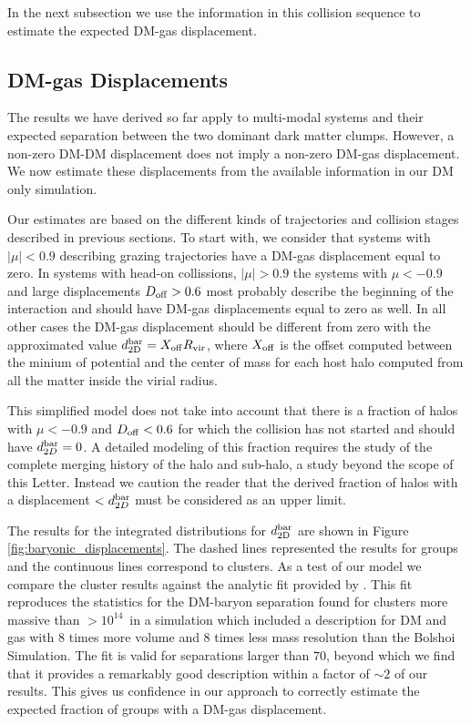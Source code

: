 \documentclass{emulateapj}
\newcommand{\hkpc}{{\ifmmode{h^{-1}{\rm kpc}}\else{$h^{-1}$kpc }\fi}}
\newcommand{\hMsun}{{\ifmmode{h^{-1}{\rm {M_{\odot}}}}\else{$h^{-1}{\rm{M_{\odot}}}$}\fi}}
\begin{document}
In the next subsection we use the information in this collision
sequence to estimate the expected DM-gas displacement. 

\subsection{DM-gas Displacements}
\label{sec:baryonic_displacements}

The results we have derived so far apply to multi-modal systems and
their expected separation between the two dominant dark matter
clumps. However, a non-zero DM-DM displacement does not imply 
a non-zero DM-gas displacement. We now estimate these displacements
from the available information in our DM only simulation.

Our estimates are based on the different kinds of trajectories and
collision stages described in previous sections. To start with, we
consider that systems with $|\mu|<0.9$ describing grazing
trajectories have a DM-gas displacement equal to zero.  In systems
with head-on collissions, $|\mu|>0.9$ the systems with $\mu<-0.9$ and
large displacements $D_{\rm   off}>0.6$ most probably describe the
beginning of the interaction and should have DM-gas displacements
equal to zero as well. In all other cases the DM-gas displacement
should be different from zero with the approximated value
$d_{\rm   2D}^{\rm bar} = X_{\rm off} R_{\rm   vir}$, where $X_{\rm   off}$ is
the offset computed between the minium of potential and the center of
mass for each host halo computed from all the matter inside the virial
radius.   


This simplified model does not take into account that there is a
fraction of halos with $\mu<-0.9$ and $D_{\rm off}<0.6$ for which the
collision has not started and should have $d_{2D}^{\rm bar}=0$. A detailed
modeling of this fraction requires the study of the complete merging
history  of the halo and sub-halo, a study beyond the scope of this
Letter. Instead we caution the reader that the derived fraction of
halos with a displacement $<d_{2D}^{\rm bar}$ must be considered as an
upper limit. 

The results for the integrated distributions for $d_{\rm 2D}^{\rm bar}$
are shown in Figure \ref{fig:baryonic_displacements}. The dashed lines
represented the results for groups and the continuous lines correspond
to clusters. As a test of our model we compare the cluster results
against the analytic fit provided by \cite{ForeroRomero2010}. This fit
reproduces the statistics for the DM-baryon separation found for
clusters more massive than $>10^{14}$\hMsun\ in a simulation
which included a description for DM and gas with $8$ times more volume
and $8$ times less mass resolution than the Bolshoi Simulation. The
fit is valid for separations larger than $70$\hkpc, beyond which we
find that it provides a remarkably good description within a factor of
$\sim 2$ of our results. This gives us confidence in our approach to
correctly estimate the expected fraction of groups with a DM-gas
displacement. 
\end{document}

